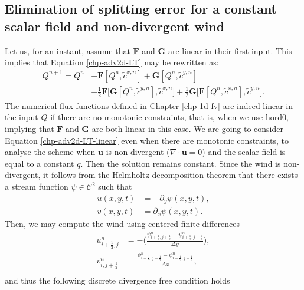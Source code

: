 \subsection{Elimination of splitting error for a constant scalar field and non-divergent wind}
Let us, for an instant, assume that $\mathbf{F}$ and $\mathbf{G}$ are linear in their first input. This implies that Equation \eqref{chp-adv2d-LT} may be rewritten as:
\begin{align}
\label{chp-adv2d-LT-linear}
    Q^{n+1} = Q^n 
    &+ \mathbf{F}[Q^n,\tilde{c}^{x,n}] + \mathbf{G}[Q^n,\tilde{c}^{y,n}] \nonumber \\
    &+\frac{1}{2}\mathbf{F}\bigg[\mathbf{G}[Q^n, \tilde{c}^{y,n}], \tilde{c}^{x,n}\bigg]+
      \frac{1}{2}\mathbf{G}\bigg[\mathbf{F}[Q^n, \tilde{c}^{x,n}], \tilde{c}^{y,n}\bigg].
\end{align}
The numerical flux functions defined in Chapter \ref{chp-1d-fv} are indeed linear in the input $Q$ if there are no monotonic constraints,
that is, when we use hord0,
implying that $\mathbf{F}$ and $\mathbf{G}$ are both linear in this case.
We are going to consider Equation \eqref{chp-adv2d-LT-linear}
even when there are monotonic constraints, to analyse the scheme when $\boldsymbol{u}$ is non-divergent ($\nabla \cdot 
\boldsymbol{u} = 0$) and the
scalar field is equal to a constant $\overline{q}$.
Then the solution remains constant. 
Since the wind is non-divergent, it follows from the Helmholtz decomposition theorem 
that there exists a stream function $\psi \in \mathcal{C}^2$ such that
\begin{align*}
    u(x,y,t) &= -\partial_y \psi(x,y,t),\\
    v(x,y,t) &= \partial_x \psi(x,y,t).
\end{align*}
Then, we may compute the wind using centered-finite differences 
\begin{align*}
    u_{i+\frac{1}{2},j}^{n}&=
    -\bigg(\frac{\psi_{i+\frac{1}{2},j+\frac{1}{2}}^{n}-\psi_{i+\frac{1}{2},j-\frac{1}{2}}^{n}}{\Delta y}\bigg),\\
    v_{i,j+\frac{1}{2}}^{n} &= 
    \frac{\psi_{i+\frac{1}{2},j+\frac{1}{2}}^{n}-\psi_{i-\frac{1}{2},j+\frac{1}{2}}^{n}}{\Delta x},\\
\end{align*}
and thus the following discrete divergence free condition holds
